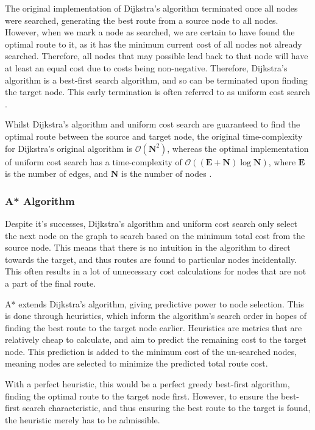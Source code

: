 \documentclass[12pt]{article}
\begin{document}
The original implementation of Dijkstra's algorithm terminated once all nodes were searched, generating the best route from a source node to all nodes. However, when we mark a node as searched, we are certain to have found the optimal route to it, as it has the minimum current cost of all nodes not already searched. Therefore, all nodes that may possible lead back to that node will have at least an equal cost due to costs being non-negative. Therefore, Dijkstra's algorithm is a best-first search algorithm, and so can be terminated upon finding the target node. This early termination is often referred to as uniform cost search \autocite{felner2011search}.

Whilst Dijkstra's algorithm and uniform cost search are guaranteed to find the optimal route between the source and target node, the original time-complexity for Dijkstra's original algorithm is $\mathcal{O}(\mathbf{N}^2)$, whereas the optimal implementation of uniform cost search has a time-complexity of $\mathcal{O} ((\mathbf{E} + \mathbf{N})\log{\mathbf{N}})$, where $\mathbf{E}$ is the number of edges, and $\mathbf{N}$ is the number of nodes \autocite{felner2011search}.

\subsubsection{A* Algorithm}

Despite it's successes, Dijkstra's algorithm and uniform cost search only select the next node on the graph to search based on the minimum total cost from the source node. This means that there is no intuition in the algorithm to direct towards the target, and thus routes are found to particular nodes incidentally. This often results in a lot of unnecessary cost calculations for nodes that are not a part of the final route.

A* extends Dijkstra's algorithm, giving predictive power to node selection. This is done through heuristics, which inform the algorithm's search order in hopes of finding the best route to the target node earlier. Heuristics are metrics that are relatively cheap to calculate, and aim to predict the remaining cost to the target node. This prediction is added to the minimum cost of the un-searched nodes, meaning nodes are selected to minimize the predicted total route cost.

With a perfect heuristic, this would be a perfect greedy best-first algorithm, finding the optimal route to the target node first. However, to ensure the best-first search characteristic, and thus ensuring the best route to the target is found, the heuristic merely has to be admissible.
\end{document}

